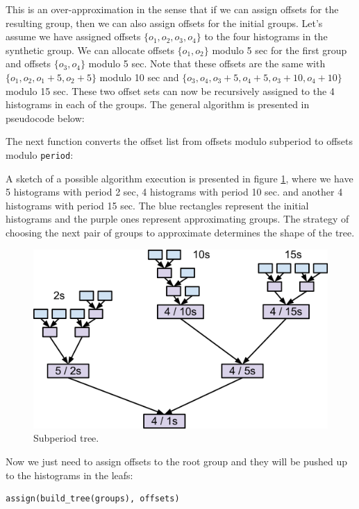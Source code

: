 This is an over-approximation in the sense that if we can assign offsets for the resulting group, then we can also assign offsets for the initial groups. Let’s assume we have assigned offsets $\{o_1,o_2,o_3,o_4\}$ to the four histograms in the synthetic group. We can allocate offsets $\{o_1, o_2\}$ modulo 5 sec for the first group and offsets $\{o_3, o_4\}$ modulo 5 sec. Note that these offsets are the same with $\{o_1, o_2, o_1 + 5, o_2 + 5\}$ modulo 10 sec and $\{o_3, o_4, o_3 + 5, o_4 + 5, o_3 + 10, o_4 + 10\}$ modulo 15 sec. These two offset sets can now be recursively assigned to the 4 histograms in each of the groups. The general algorithm is presented in pseudocode below:

The next function converts the offset list from offsets modulo subperiod to offsets modulo \verb+period+:

A sketch of a possible algorithm execution is presented in figure \ref{fig:subperiod_tree}, where we have 5 histograms with period 2 sec, 4 histograms with period 10 sec. and another 4 histograms with period 15 sec. The blue rectangles represent the initial histograms and the purple ones represent approximating groups. The strategy of choosing the next pair of groups to approximate determines the shape of the tree.
\begin{figure}[ht!]
\centering
\includegraphics[scale=0.6]{Images/subperiod_tree.png}
\caption{Subperiod tree.}
\label{fig:subperiod_tree}
\end{figure}

Now we just need to assign offsets to the root group and they will be pushed up to the histograms in the leafs:
\begin{verbatim}
assign(build_tree(groups), offsets)
\end{verbatim}


